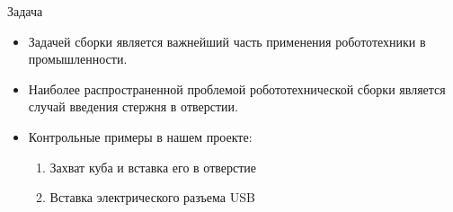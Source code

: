 \documentclass{beamer}
\begin{document}
\begin{frame}{Задача}
    \begin{itemize}
        \item <1> Задачей сборки является важнейший часть применения робототехники в промышленности.
        \item <2> Наиболее распространенной проблемой робототехнической сборки является случай введения стержня в отверстии.
        \item <3-5> Контрольные примеры в нашем проекте:
        \begin{enumerate}
            \item <4> Захват куба и вставка его в отверстие
            \item <5> Вставка электрического разъема USB
        \end{enumerate}
    \end{itemize}
\end{frame}
\end{document}
